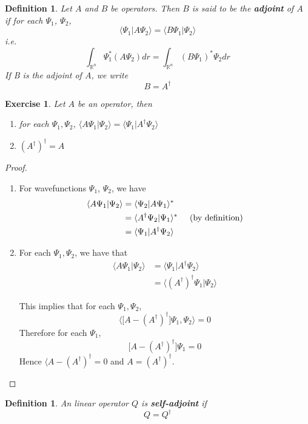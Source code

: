 \documentclass[12pt]{amsart}
\newtheorem{defn}[thm]{Definition}
\newtheorem{ex}[thm]{Exercise}
\renewcommand{\r}{\rangle}
\renewcommand{\l}{\langle}
\newcommand{\R}{\mathbb{R}}
\begin{document}
\begin{defn}
Let $A$ and $B$ be operators. Then $B$ is said to be the \textbf{adjoint} of $A$ if for each $\Psi_1$, $\Psi_2$, $$\l \Psi_1 \vert A\Psi_2 \r = \l B \Psi_1 \vert \Psi_2 \r$$ i.e. $$\int_{\R^n}\Psi_1^* (A\Psi_2) dr = \int_{\R^n}(B\Psi_1)^* \Psi_2 dr$$ If B is the adjoint of $A$, we write $$B = A^{\dagger}$$
\end{defn}

\begin{ex}
Let $A$ be an operator, then \begin{enumerate}
\item for each $\Psi_1, \Psi_2$, $\l A\Psi_1 \vert \Psi_2 \r = \l   \Psi_1 \vert A^{\dagger} \Psi_2 \r$ 
\item $(A^{\dagger})^{\dagger} = A$
\end{enumerate}
\end{ex}

\begin{proof}
\begin{enumerate}
\item For wavefunctions $\Psi_1$, $\Psi_2$, we have
\begin{align*}
\l A \Psi_1 \vert \Psi_2 \r
&= \l \Psi_2 \vert A \Psi_1 \r^*\\
&= \l A^{\dagger}\Psi_2 \vert  \Psi_1 \r^* \hspace{.5cm} \text{(by definition)}\\
&= \l  \Psi_1 \vert A^{\dagger}\Psi_2 \r
\end{align*}
\item For each $\Psi_1, \Psi_2$, we have that
\begin{align*}
\l  A\Psi_1 \vert \Psi_2 \r
&= \l   \Psi_1 \vert A^{\dagger}\Psi_2 \r \\
&= \l  (A^{\dagger})^{\dagger} \Psi_1 \vert \Psi_2 \r
\end{align*}

This implies that for each $\Psi_1, \Psi_2$, $$\big \l \big[A-(A^{\dagger})^{\dagger} \big] \Psi_1, \Psi_2 \big \r = 0$$ Therefore for each $\Psi_1$, $$ \big[A-(A^{\dagger})^{\dagger} \big] \Psi_1 = 0$$ Hence $ \l A-(A^{\dagger})^{\dagger}  = 0$ and $A = (A^{\dagger})^{\dagger}$.
\end{enumerate}
\end{proof}

\begin{defn}
An linear operator $Q$ is \textbf{self-adjoint} if $$Q = Q^{\dagger}$$
\end{defn}
\end{document}

